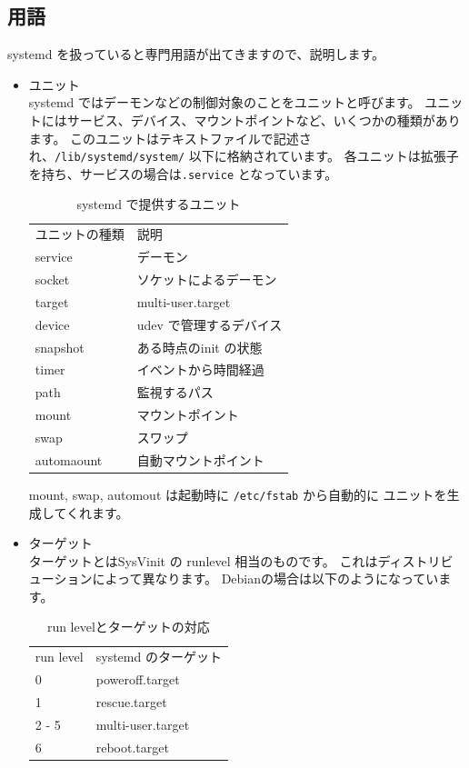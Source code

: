 \documentclass[mingoth,a4paper]{jsarticle}
\begin{document}
\subsection{用語}

systemd を扱っていると専門用語が出てきますので、説明します。

\begin{itemize}
\item ユニット\\
systemd ではデーモンなどの制御対象のことをユニットと呼びます。
ユニットにはサービス、デバイス、マウントポイントなど、いくつかの種類があります。
このユニットはテキストファイルで記述され、\texttt{/lib/systemd/system/} 以下に格納されています。
各ユニットは拡張子を持ち、サービスの場合は\texttt{.service}
となっています。


\begin{table}[htb]
\begin{center}
  \begin{tabular}{ll}
    ユニットの種類 & 説明 \\
    service & デーモン \\
    socket & ソケットによるデーモン \\
    target & multi-user.target \\
    device & udev で管理するデバイス \\
    snapshot & ある時点のinit の状態 \\
    timer & イベントから時間経過 \\
    path & 監視するパス \\
    mount & マウントポイント \\
    swap & スワップ \\
    automaount & 自動マウントポイント \\
  \end{tabular}
\caption{systemd で提供するユニット}
\label{tbl:unit}
\end{center}
\end{table}

mount, swap, automout は起動時に \texttt{/etc/fstab} から自動的に
ユニットを生成してくれます。

\item ターゲット\\
ターゲットとはSysVinit の runlevel 相当のものです。
これはディストリビューションによって異なります。
Debianの場合は以下のようになっています。

\begin{table}[htb]
\begin{center}
  \begin{tabular}{ll}
    run level & systemd のターゲット \\
    0 & poweroff.target \\
    1 & rescue.target \\
    2 - 5 & multi-user.target \\
    6 & reboot.target \\
  \end{tabular}
\caption{run levelとターゲットの対応}
\label{tbl:target}
\end{center}
\end{table}


\end{itemize}
\end{document}
